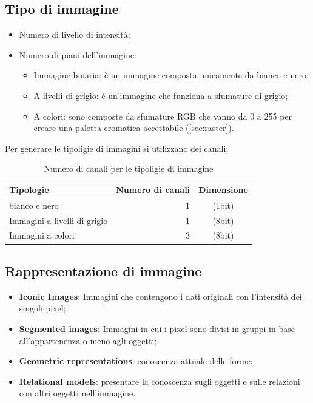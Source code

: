 \documentclass{report}
\begin{document}
\subsection{Tipo di immagine}
\label{sec:tipodiimm}
\begin{itemize}
\item Numero di livello di intensità;
\item Numero di piani dell'immagine:
  \begin{itemize}
  \item Immagine binaria: è un immagine composta unicamente da bianco e
    nero;
  \item A livelli di grigio: è un'immagine che funziona a sfumature di
    grigio;
  \item A colori: sono composte da sfumature RGB che vanno da 0 a 255
    per creare una paletta cromatica accettabile (\ref{sec:raster}).
  \end{itemize}
\end{itemize}
Per generare le tipoligie di immagini si utilizzano dei canali:
\begin{table}[ht!]
  \centering
  \begin{tabular}{lrc}
    \textbf{Tipologie}&\textbf{Numero di canali}& \textbf{Dimensione}
    \\\hline
    bianco e nero & 1 &(1bit)\\
    Immagini a livelli di grigio & 1 &(8bit)\\
    Immagini a colori & 3 &(8bit)\\\hline
  \end{tabular}
  
  \caption{Numero di canali per le tipoligie di immagine}
  \label{tab:numcanimg}
\end{table}

\subsection{Rappresentazione di immagine}
\label{sec:raprimg}
\begin{itemize}
\item \textbf{Iconic Images}: Immagini che contengono i dati originali
  con l'intensità dei singoli pixel;
\item \textbf{Segmented images}: Immagini in cui i pixel sono divisi in
  gruppi in base all'appartenenza o meno agli oggetti;
\item \textbf{Geometric representations}: conoscenza attuale delle forme;
\item \textbf{Relational models}: presentare la conoscenza sugli oggetti
  e sulle relazioni con altri oggetti nell'immagine.
\end{itemize}
\end{document}
